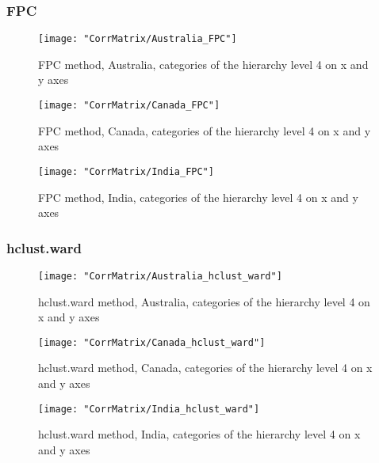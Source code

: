 \documentclass[a4paper]{article}
\begin{document}
\subsubsection{FPC}

\begin{figure}[H]
\begin{center}
\texttt{[image: "CorrMatrix/Australia\_FPC"]}
\caption{FPC method, Australia, categories of the hierarchy level 4 on x and y axes}
\label{fig:2}
\end{center}
\end{figure}

\begin{figure}[H]
\begin{center}
\texttt{[image: "CorrMatrix/Canada\_FPC"]}
\caption{FPC method, Canada, categories of the hierarchy level 4 on x and y axes}
\label{fig:2}
\end{center}
\end{figure}

\begin{figure}[H]
\begin{center}
\texttt{[image: "CorrMatrix/India\_FPC"]}
\caption{FPC method, India, categories of the hierarchy level 4 on x and y axes}
\label{fig:2}
\end{center}
\end{figure}

\subsubsection{hclust.ward}

\begin{figure}[H]
\begin{center}
\texttt{[image: "CorrMatrix/Australia\_hclust\_ward"]}
\caption{hclust.ward method, Australia, categories of the hierarchy level 4 on x and y axes}
\label{fig:2}
\end{center}
\end{figure}

\begin{figure}[H]
\begin{center}
\texttt{[image: "CorrMatrix/Canada\_hclust\_ward"]}
\caption{hclust.ward method, Canada, categories of the hierarchy level 4 on x and y axes}
\label{fig:2}
\end{center}
\end{figure}

\begin{figure}[H]
\begin{center}
\texttt{[image: "CorrMatrix/India\_hclust\_ward"]}
\caption{hclust.ward method, India, categories of the hierarchy level 4 on x and y axes}
\label{fig:2}
\end{center}
\end{figure}
\end{document}
